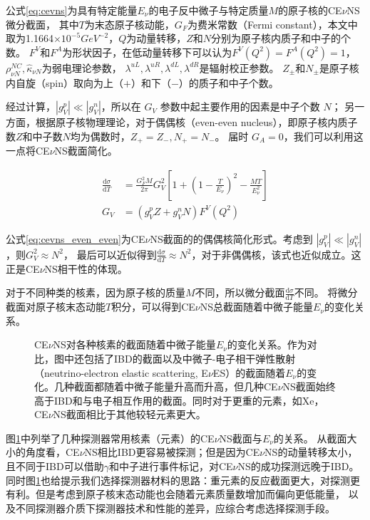 公式\ref*{eq:cevns}为具有特定能量$E_{\nu}$的电子反中微子与特定质量$M$的原子核的CE$\nu$NS微分截面，
其中$T$为末态原子核动能，$G_F$为费米常数（Fermi constant），本文中取为1.1664$\times10^{-5}\si{GeV}^{-2}$，$Q$为动量转移，$Z$和$N$分别为原子核内质子和中子的个数。
$F^V$和$F^A$为形状因子，在低动量转移下可以认为$F^V(Q^2)=F^A(Q^2)=1$\cite{lewin_review_1996}，
$\rho_{\nu N}^{NC},\hat{\kappa}_{\nu N}$为弱电理论参数，
$\lambda^{uL},\lambda^{uR},\lambda^{dL},\lambda^{dR}$是辐射校正参数\cite{barranco_probing_2005}。
$Z_{\pm}$和$N_{\pm}$是原子核内自旋（spin）取向为上（$+$）和下（$-$）的质子和中子个数。

经过计算，$|g_V^p|\ll|g_V^n|$，所以在 $G_V$ 参数中起主要作用的因素是中子个数 $N$；
另一方面，根据原子核物理理论，对于偶偶核（even-even nucleus），即原子核内质子数$Z$和中子数$N$均为偶数时，$Z_{+}=Z_{-},N_{+}=N_{-}$。
届时 $G_A=0$，我们可以利用这一点将CE$\nu$NS截面简化。

\begin{align}
    \label{eq:cevns_even_even}
    \frac{\mathrm{d}\sigma}{\mathrm{d}T} &= \frac{G_F^2 M}{2\pi}G_V^2\left[1+(1-\frac{T}{E_{\nu}})^2-\frac{MT}{E_{\nu}^2}\right] \\
    G_V &= (g_V^p Z+g_V^n N)F^V(Q^2)
\end{align}

公式\ref{eq:cevns_even_even}为CE$\nu$NS截面的的偶偶核简化形式。考虑到 $|g_V^p|\ll|g_V^n|$，则$G_V^2\approx N^2$，
最后可以近似得到$\frac{\mathrm{d}\sigma}{\mathrm{d}T}\approx N^2$，对于非偶偶核，该式也近似成立。这正是CE$\nu$NS相干性的体现。

对于不同种类的核素，因为原子核的质量$M$不同，所以微分截面$\frac{\mathrm{d}\sigma}{\mathrm{d}T}$不同。
将微分截面对原子核末态动能$T$积分，可以得到CE$\nu$NS总截面随着中微子能量$E_{\nu}$的变化关系。

\begin{figure}
    \centering
    
    \caption{CE$\nu$NS对各种核素的截面随着中微子能量$E_{\nu}$的变化关系。作为对比，图中还包括了IBD\cite{akimov_observation_2017}的截面以及中微子-电子相干弹性散射（neutrino-electron elastic scattering, E$\nu$ES）的截面随着$E_{\nu}$的变化。几种截面都随着中微子能量升高而升高，但几种CE$\nu$NS截面始终高于IBD和与电子相互作用的截面。同时对于更重的元素，如$\mathrm{Xe}$，CE$\nu$NS截面相比于其他较轻元素更大。}
    \label{fig:xsec_elements}
\end{figure}

图\ref{fig:xsec_elements}中列举了几种探测器常用核素（元素）的CE$\nu$NS截面与$E_{\nu}$的关系。
从截面大小的角度看，CE$\nu$NS相比IBD更容易被探测；但是因为CE$\nu$NS的动量转移太小，且不同于IBD可以借助$\gamma$和中子进行事件标记，对CE$\nu$NS的成功探测远晚于IBD。
同时图\ref{fig:xsec_elements}也给提示我们选择探测器材料的思路：重元素的反应截面更大，对探测更有利。但是考虑到原子核末态动能也会随着元素质量数增加而偏向更低能量，
以及不同探测器介质下探测器技术和性能的差异，应综合考虑选择探测手段。

